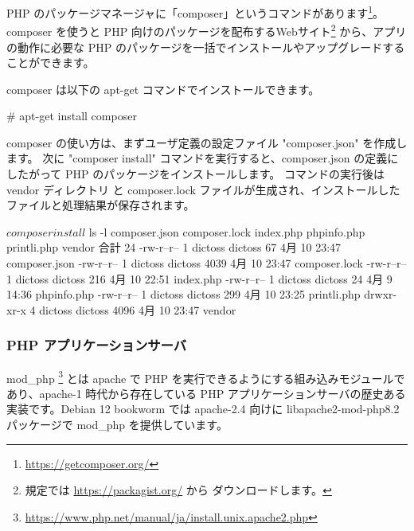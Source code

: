 \documentclass[mingoth,a4paper]{jsarticle}
\begin{document}

PHP のパッケージマネージャに「composer」というコマンドがあります\footnote{\url{https://getcomposer.org/}}。
composer を使うと PHP 向けのパッケージを配布するWebサイト\footnote{規定では \url{https://packagist.org/} から
ダウンロードします。} から、アプリの動作に必要な PHP のパッケージを一括でインストールやアップグレードすることができます。

composer は以下の apt-get コマンドでインストールできます。

\begin{commandline}
# apt-get install composer
\end{commandline}

composer の使い方は、まずユーザ定義の設定ファイル "composer.json" を作成します。
次に "composer install" コマンドを実行すると、composer.json の定義にしたがって PHP のパッケージをインストールします。
コマンドの実行後は vendor ディレクトリ と composer.lock ファイルが生成され、インストールしたファイルと処理結果が保存されます。


\begin{commandline}
$ composer install
$ ls -l
composer.json  composer.lock  index.php  phpinfo.php  printli.php  vendor
合計 24
-rw-r--r-- 1 dictoss dictoss   67  4月 10 23:47 composer.json
-rw-r--r-- 1 dictoss dictoss 4039  4月 10 23:47 composer.lock
-rw-r--r-- 1 dictoss dictoss  216  4月 10 22:51 index.php
-rw-r--r-- 1 dictoss dictoss   24  4月  9 14:36 phpinfo.php
-rw-r--r-- 1 dictoss dictoss  299  4月 10 23:25 printli.php
drwxr-xr-x 4 dictoss dictoss 4096  4月 10 23:47 vendor
\end{commandline}


\subsubsection{PHP アプリケーションサーバ}


mod\_php \footnote{\url{https://www.php.net/manual/ja/install.unix.apache2.php}} とは apache で PHP を実行できるようにする組み込みモジュールであり、apache-1 時代から存在している PHP アプリケーションサーバの歴史ある実装です。Debian 12 bookworm では apache-2.4 向けに libapache2-mod-php8.2 パッケージで mod\_php を提供しています。
\end{document}
